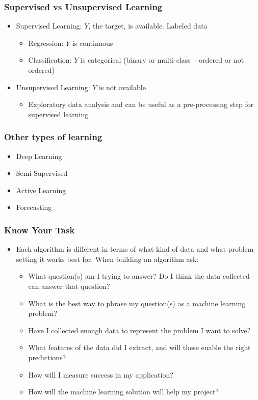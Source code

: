 \documentclass[compress, aspectratio=54]{beamer}
\begin{document}
\begin{frame}
\frametitle{Supervised vs Unsupervised Learning}
\begin{itemize}

\item Supervised Learning: $Y$, the target, is available. Labeled data
\begin{itemize}

\item Regression: $Y$ is continuous
\item Classification: $Y$ is categorical (binary or multi-class -- ordered or not ordered)
\end{itemize}

\item  Unsupervised Learning: $Y$ is not available
\begin{itemize}

\item Exploratory data analysis and can be useful as a
pre-processing step for supervised learning
\end{itemize}
\end{itemize}
\end{frame}


\begin{frame}
\frametitle{Other types of learning}
\begin{itemize}
\item Deep Learning
\item Semi-Supervised
\item Active Learning
\item Forecasting
\end{itemize}
\end{frame}


\begin{frame}
\frametitle{Know Your Task}
\begin{itemize}
\item  Each algorithm is different in terms of what kind of data and what problem setting
it works best for. When building an algorithm ask: 
\begin{itemize}
\item What question(s) am I trying to answer? Do I think the data collected
can answer that question?
\item What is the best way to phrase my question(s) as a machine learning
problem?
\item Have I collected enough data to represent the problem I want to solve?
\item What features of the data did I extract, and will these enable the
right predictions?
\item How will I measure success in my application?
\item How will the machine learning solution will help my project?
\end{itemize}
\end{itemize}
\end{frame}
\end{document}

